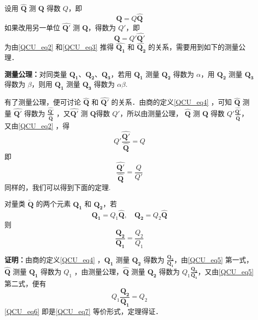 设用 $\hat{\boldsymbol{Q}}$ 测 $\boldsymbol{Q}$ 得数 $Q$，即
\begin{equation}\label{QCU_eq2}
\boldsymbol{Q}=Q\hat{\boldsymbol{Q}}
\end{equation}
如果改用另一单位 $\hat{\boldsymbol{Q'}}$ 测 $\boldsymbol{Q}$，得数为 $Q'$，即
\begin{equation}\label{QCU_eq3}
\boldsymbol{Q}=Q'\hat{\boldsymbol{Q'}}
\end{equation}
为由\autoref{QCU_eq2} 和\autoref{QCU_eq3} 推得 $\hat{\boldsymbol{Q_1}}$ 和 $\hat{\boldsymbol{Q_2}}$ 的关系，需要用到如下的测量公理．

\textbf{测量公理：}对同类量 $\boldsymbol{Q_1}$、$\boldsymbol{Q_2}$、$\boldsymbol{Q_3}$，若用 $\boldsymbol{Q_1}$ 测量 $\boldsymbol{Q_2}$ 得数为 $\alpha$，用 $\boldsymbol{Q_2}$ 测量 $\boldsymbol{Q_3}$ 得数为 $\beta$，则用 $\boldsymbol{Q_1}$ 测量 $\boldsymbol{Q_3}$ 得数为 $\alpha\beta$.

有了测量公理，便可讨论 $\hat{\boldsymbol{Q}}$ 和 $\hat{\boldsymbol{Q'}}$ 的关系．由商的定义\autoref{QCU_eq4} ，可知 $\hat{\boldsymbol{Q}}$ 测量 $\hat{\boldsymbol{Q'}}$ 得数为 $\frac{\hat{\boldsymbol{Q'}}}{\hat{\boldsymbol{Q}}}$ ，又$\hat{\boldsymbol{Q'}}$ 测 $\boldsymbol{Q}$得数 $Q'$，所以由测量公理， $\hat{\boldsymbol{Q}}$ 测 $\boldsymbol{Q}$ 得数 $Q'\frac{\hat{\boldsymbol{Q'}}}{\hat{\boldsymbol{Q}}}$，又由\autoref{QCU_eq2} ，得
\begin{equation}
Q'\frac{\hat{\boldsymbol{Q'}}}{\hat{\boldsymbol{Q}}}=Q
\end{equation}
即
\begin{equation}\label{QCU_eq8}
\frac{\hat{\boldsymbol{Q'}}}{\hat{\boldsymbol{Q}}}=\frac{Q}{Q'}
\end{equation}
同样的，我们可以得到下面的定理.
\begin{theorem}{}\label{QCU_the1}
对量类 $\widetilde{\boldsymbol{Q}}$ 的两个元素 $\boldsymbol{Q_1}$ 和 $\boldsymbol{Q_2}$，若
\begin{equation}\label{QCU_eq5}
\boldsymbol{Q_1}=Q_1\hat{\boldsymbol{Q}},\quad \boldsymbol{Q_2}=Q_2\hat{\boldsymbol{Q}}
\end{equation}
则
\begin{equation}\label{QCU_eq7}
\frac{\boldsymbol{Q_2}}{\boldsymbol{Q_1}}=\frac{Q_2}{Q_1}
\end{equation}
\end{theorem}
\textbf{证明：}由商的定义\autoref{QCU_eq4} ，$\boldsymbol{Q_1}$ 测量 $\boldsymbol{Q_2}$ 得数为 $\frac{\boldsymbol{Q_2}}{\boldsymbol{Q_1}}$，由\autoref{QCU_eq5} 第一式， $\hat{\boldsymbol{Q}}$ 测量 $\boldsymbol{Q_1}$ 得数为 $Q_1$ ，由测量公理，$\hat{\boldsymbol{Q}}$ 测量 $\boldsymbol{Q_2}$ 得数为 $Q_1\frac{\boldsymbol{Q_2}}{\boldsymbol{Q_1}}$，又由\autoref{QCU_eq5} 第二式，便有
\begin{equation}\label{QCU_eq6}
Q_1\frac{\boldsymbol{Q_2}}{\boldsymbol{Q_1}}=Q_2
\end{equation}
\autoref{QCU_eq6} 即是\autoref{QCU_eq7} 等价形式，定理得证．

